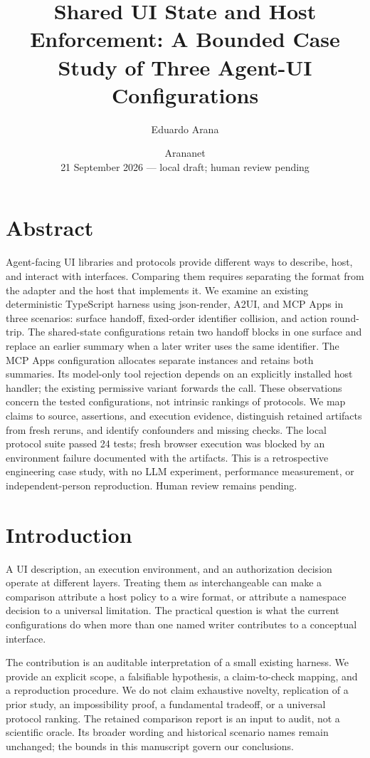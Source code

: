 \documentclass[11pt]{article}
\title{Shared UI State and Host Enforcement: A Bounded Case Study of
Three Agent-UI Configurations}
\author{Eduardo Arana}
\date{Arananet\\[4pt]21 September 2026 --- local draft; human review
pending}
\begin{document}
\maketitle
\section*{Abstract}\label{abstract}

Agent-facing UI libraries and protocols provide different ways to
describe, host, and interact with interfaces. Comparing them requires
separating the format from the adapter and the host that implements it.
We examine an existing deterministic TypeScript harness using
json-render, A2UI, and MCP Apps in three scenarios: surface handoff,
fixed-order identifier collision, and action round-trip. The
shared-state configurations retain two handoff blocks in one surface and
replace an earlier summary when a later writer uses the same identifier.
The MCP Apps configuration allocates separate instances and retains both
summaries. Its model-only tool rejection depends on an explicitly
installed host handler; the existing permissive variant forwards the
call. These observations concern the tested configurations, not
intrinsic rankings of protocols. We map claims to source, assertions,
and execution evidence, distinguish retained artifacts from fresh
reruns, and identify confounders and missing checks. The local protocol
suite passed 24 tests; fresh browser execution was blocked by an
environment failure documented with the artifacts. This is a
retrospective engineering case study, with no LLM experiment,
performance measurement, or independent-person reproduction. Human
review remains pending.

\section{Introduction}\label{introduction}

A UI description, an execution environment, and an authorization
decision operate at different layers. Treating them as interchangeable
can make a comparison attribute a host policy to a wire format, or
attribute a namespace decision to a universal limitation. The practical
question is what the current configurations do when more than one named
writer contributes to a conceptual interface.

The contribution is an auditable interpretation of a small existing
harness. We provide an explicit scope, a falsifiable hypothesis, a
claim-to-check mapping, and a reproduction procedure. We do not claim
exhaustive novelty, replication of a prior study, an impossibility
proof, a fundamental tradeoff, or a universal protocol ranking. The
retained comparison report is an input to audit, not a scientific
oracle. Its broader wording and historical scenario names remain
unchanged; the bounds in this manuscript govern our conclusions.
\end{document}
